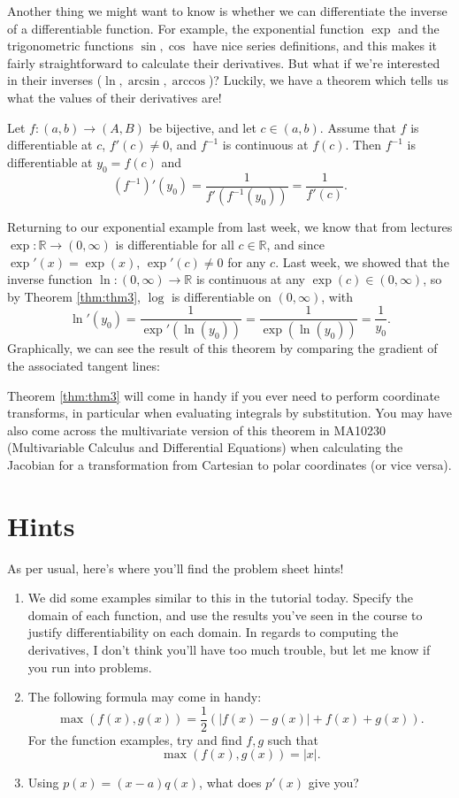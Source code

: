 \documentclass[
  12pt,
  a4paper]{extarticle}
\providecommand{\tightlist}{%
  \setlength{\itemsep}{0pt}\setlength{\parskip}{0pt}}
\theoremstyle{plain}
\theoremstyle{definition}
\theoremstyle{plain}
\theoremstyle{plain}
\theoremstyle{plain}
\theoremstyle{plain}
\theoremstyle{definition}
\theoremstyle{definition}
\theoremstyle{remark}
\theoremstyle{remark}
\let\BeginKnitrBlock\begin \let\EndKnitrBlock\end
\renewcommand{\;}{\,}
\begin{document}
Another thing we might want to know is whether we can differentiate the inverse of a differentiable function. For example, the exponential function \(\exp\) and the trigonometric functions \(\sin, \cos\) have nice series definitions, and this makes it fairly straightforward to calculate their derivatives. But what if we're interested in their inverses (\(\ln, \arcsin, \arccos\))? Luckily, we have a theorem which tells us what the values of their derivatives are!

\BeginKnitrBlock{theorem}[Inverse Function Theorem]
{\label{thm:thm3} }Let \(f: (a,b) \to (A, B)\) be bijective, and let \(c \in (a,b).\) Assume that \(f\) is differentiable at \(c\), \(f'(c) \neq 0\), and \(f^{-1}\) is continuous at \(f(c).\) Then \(f^{-1}\) is differentiable at \(y_0 = f(c)\) and \[\left(f^{-1}\right)'(y_0) = \frac{1}{f'\left(f^{-1}(y_0)\right)} = \frac{1}{f'(c)}.\]
\EndKnitrBlock{theorem}

\BeginKnitrBlock{example}
{\label{exm:ex1} }Returning to our exponential example from last week, we know that from lectures \(\exp: \mathbb{R} \to (0,\infty)\) is differentiable for all \(c \in \mathbb{R}\), and since \(\exp'(x) = \exp(x)\), \(\exp'(c) \neq 0\) for any \(c\). Last week, we showed that the inverse function \(\ln: (0,\infty) \to \mathbb{R}\) is continuous at any \(\exp(c) \in (0,\infty)\), so by Theorem \ref{thm:thm3}, \(\log\) is differentiable on \((0,\infty)\), with \[\ln'(y_0) = \frac{1}{\exp'(\ln(y_0))} = \frac{1}{\exp(\ln(y_0))} = \frac{1}{y_0}.\] Graphically, we can see the result of this theorem by comparing the gradient of the associated tangent lines:
\EndKnitrBlock{example}

Theorem \ref{thm:thm3} will come in handy if you ever need to perform coordinate transforms, in particular when evaluating integrals by substitution. You may have also come across the multivariate version of this theorem in MA10230 (Multivariable Calculus and Differential Equations) when calculating the Jacobian for a transformation from Cartesian to polar coordinates (or vice versa).

\hypertarget{hints}{%
\section{Hints}\label{hints}}

As per usual, here's where you'll find the problem sheet hints!

\begin{enumerate}
\def\labelenumi{\arabic{enumi})}
\tightlist
\item
  We did some examples similar to this in the tutorial today. Specify the domain of each function, and use the results you've seen in the course to justify differentiability on each domain. In regards to computing the derivatives, I don't think you'll have too much trouble, but let me know if you run into problems.
\item
  The following formula may come in handy:\[\max(f(x),g(x)) = \frac{1}{2}\left(\lvert f(x) - g(x) \rvert + f(x) + g(x)\right).\]
  For the function examples, try and find \(f,g\) such that \[\max(f(x),g(x)) = \lvert x \rvert.\]
\item
  Using \(p(x) = (x-a)q(x)\), what does \(p'(x)\) give you?
\end{enumerate}
\end{document}
